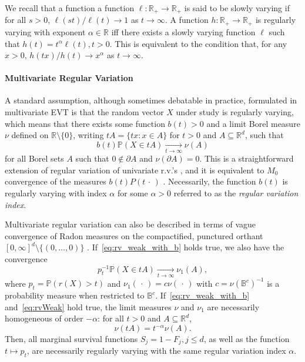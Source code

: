 \documentclass{article}
\numberwithin{equation}{section}
\renewcommand{\P}{\mathbb{P}}
\newcommand{\rset}{\mathbb{R}}
\newcommand{\point}{\,\cdot\,}
\newcommand{\PP}{\P}%
\newcommand{\ball}{\mathbb{B}}
\newcommand{\tto}{\xrightarrow[t\to\infty]{}}
\begin{document}
We recall that a function a function $\ell: \rset_+\to\rset_+$ is said to be slowly varying if for all $s>0$,
$\ell(st)/\ell(t) \to 1$ as $t\to \infty$.
A function 
$h:\rset_+\to\rset_+$ is regularly varying with exponent $\alpha\in\rset$ iff  there exists a slowly varying function $\ell$ such that $h(t) = t^{\alpha }\ell(t), t>0$. This is equivalent to the condition that, for any $x>0$, $h(tx)/h(t)\to x^{\alpha}$ as $t\to\infty$. 

\paragraph{Multivariate Regular Variation}
A standard assumption, although sometimes debatable in practice, 
formulated in multivariate EVT is that the random vector $X$ under study is regularly varying, which means that there exists some function $b(t)>0$ and a limit Borel measure $\nu$ defined on $\rset\setminus\{0\}$,
writing $t A = \{ t x : x \in A
\}$ for $t > 0$ and $A \subseteq \mathbb{R}^d$, such that
\begin{equation}\label{eq:rv_weak_with_b}
  b(t)\PP(X\in tA) \tto \nu(A)
  \end{equation}
  for all Borel sets $A$ such that $0\notin\partial A$ and $\nu(\partial A) = 0$. This is a straightforward extension of regular variation of univariate r.v.'s \citep{Bingham1987}, and it is equivalent to $M_0$ convergence of the measures $b(t) P(t\point)$ \citep{hult2006regular}.  Necessarily, the function $b(t)$ is regularly varying with index $\alpha$ for some $\alpha>0$  referred to as the \textit{regular variation index}. 
  
  Multivariate regular variation can also be
described in terms of vague convergence of Radon measures on
the compactified, punctured orthant $[0, \infty]^d \setminus \{(0,
\ldots, 0)\}$ \citep{resnick2007heavy}.
If~\eqref{eq:rv_weak_with_b} holds true, we also have the convergence
\begin{equation}\label{eq:rvWeak}
  p_t^{-1}\PP(X\in tA) \tto \nu_1(A),
  \end{equation}
  where $p_t = \PP(r(X)>t)$ and $\nu_1(\point) = c \nu(\point)$ with $c= \nu(\ball^c)^{-1}$ is a probability measure when restricted to $\ball^c$.
  If~\eqref{eq:rv_weak_with_b} and~\eqref{eq:rvWeak} hold true, the limit measures $\nu$ and $\nu_1$ are necessarily homogeneous of order $- \alpha$: for all $t>0$ and $A\subseteq \mathbb{R}^d$,
\begin{equation}\label{homogeneity-nu}
    \nu(tA) = t^{-\alpha} \nu(A). 
\end{equation} 
Then, all marginal survival functions  $S_j = 1 - F_j, j\le d$, as well as the function $t\mapsto p_t$,  are necessarily regularly varying with the same regular variation index $\alpha$.
\end{document}
